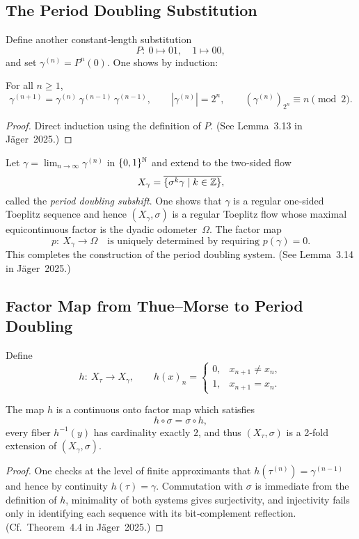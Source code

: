 \subsection{The Period Doubling Substitution}
Define another constant‑length substitution
\[
P:\ 0 \mapsto 01,\quad 1 \mapsto 00,
\]
and set $\gamma^{(n)}=P^n(0)$.  One shows by induction:
\begin{lemma}\label{lem:pd-recursion}
For all $n\ge1$,
\[
\gamma^{(n+1)} = \gamma^{(n)}\,\gamma^{(n-1)}\,\gamma^{(n-1)},
\qquad |\gamma^{(n)}|=2^n,
\qquad (\gamma^{(n)})_{2^n}\equiv n\pmod2.
\]
\end{lemma}
\begin{proof}
Direct induction using the definition of $P$.  (See Lemma 3.13 in Jäger 2025.)
\end{proof}

Let $\gamma=\lim_{n\to\infty}\gamma^{(n)}$ in $\{0,1\}^{\mathbb{N}}$ and extend to the two‑sided flow
\[
X_\gamma=\overline{\{\sigma^k\gamma\mid k\in\mathbb{Z}\}},
\]
called the \emph{period doubling subshift}.  One shows that $\gamma$ is a regular one‑sided
Toeplitz sequence and hence $(X_\gamma,\sigma)$ is a regular Toeplitz flow whose maximal equi\-con\-ti\-nuous factor is the dyadic odometer~$\Omega$.  The factor map
\[
p:\ X_\gamma\to\Omega
\quad\text{is uniquely determined by requiring }p(\gamma)=0.
\]
This completes the construction of the period doubling system.  (See Lemma 3.14 in Jäger 2025.)

\subsection{Factor Map from Thue–Morse to Period Doubling}
Define
\[
h:\ X_\tau\to X_\gamma,
\qquad
h(x)_n = \begin{cases}0,&x_{n+1}\neq x_n,\\1,&x_{n+1}=x_n.\end{cases}
\]
\begin{theorem}\label{thm:tm-to-pd}
The map $h$ is a continuous onto factor map which satisfies
\[
h\circ\sigma = \sigma\circ h,
\]
every fiber $h^{-1}(y)$ has cardinality exactly $2$, and thus $(X_\tau,\sigma)$ is a 2‑fold extension of $(X_\gamma,\sigma)$.
\end{theorem}
\begin{proof}
One checks at the level of finite approximants that $h(\tau^{(n)})=\gamma^{(n-1)}$ and hence by continuity $h(\tau)=\gamma$.  Commutation with $\sigma$ is immediate from the definition of $h$, minimality of both systems gives surjectivity, and injectivity fails only in identifying each sequence with its bit‑complement reflection.  (Cf. Theorem 4.4 in Jäger 2025.)
\end{proof}

